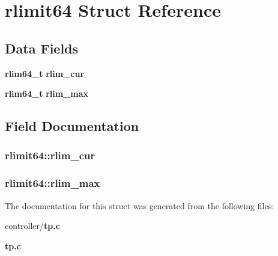 \section{rlimit64 Struct Reference}
\label{structrlimit64}
\subsection*{Data Fields}
\begin{DoxyCompactItemize}
\item 
{\bf rlim64\_\-t} {\bf rlim\_\-cur}
\item 
{\bf rlim64\_\-t} {\bf rlim\_\-max}
\end{DoxyCompactItemize}


\subsection{Field Documentation}
\subsubsection[{rlim\_\-cur}]{ {\bf rlimit64::rlim\_\-cur}}\label{structrlimit64_a9eff8003ed226942a9396272a1913733}
\subsubsection[{rlim\_\-max}]{ {\bf rlimit64::rlim\_\-max}}\label{structrlimit64_a87aeaa6419e8a29f44cf459e7c68d3c6}


The documentation for this struct was generated from the following files:\begin{DoxyCompactItemize}
\item 
controller/{\bf tp.c}\item 
{\bf tp.c}\end{DoxyCompactItemize}
